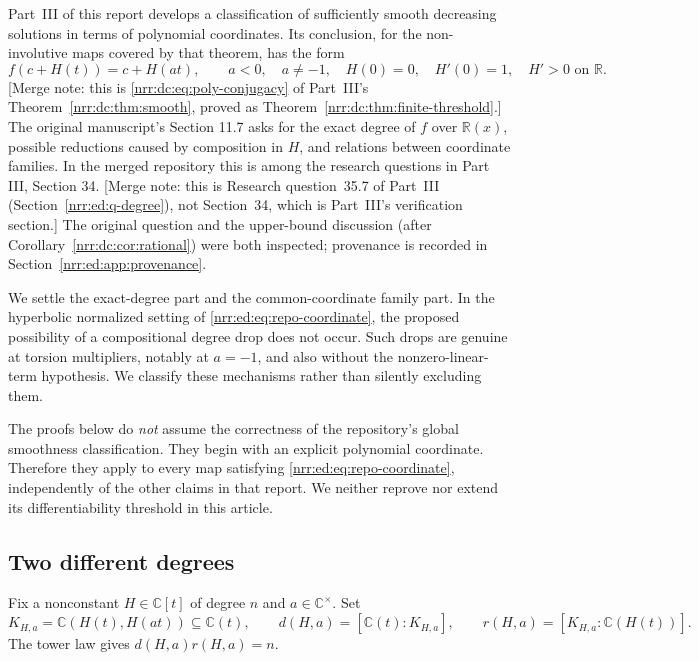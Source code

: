 \documentclass[11pt,letterpaper]{article}
\theoremstyle{definition}
\theoremstyle{remark}
\newcommand{\R}{\mathbb R}
\newcommand{\C}{\mathbb C}
\newcommand{\field}{K_{H,a}}
\begin{document}
Part~III of this report develops a classification of sufficiently smooth decreasing
solutions in terms of polynomial coordinates. Its conclusion, for the
non-involutive maps covered by that theorem, has the form
\begin{equation}
 f(c+H(t))=c+H(at),\qquad
 a<0,\quad a\ne-1,\quad H(0)=0,\quad H'(0)=1,\quad H'>0\text{ on }\R.
 \label{nrr:ed:eq:repo-coordinate}
\end{equation}
[Merge note: this is \eqref{nrr:dc:eq:poly-conjugacy} of Part~III's
Theorem~\ref{nrr:dc:thm:smooth}, proved as
Theorem~\ref{nrr:dc:thm:finite-threshold}.]
The original manuscript's Section 11.7 asks for the exact degree of $f$ over
$\R(x)$, possible reductions caused by composition in $H$, and relations between
coordinate families. In the merged repository this is among the research questions
in Part III, Section 34. [Merge note: this is Research question~35.7 of
Part~III (Section~\ref{nrr:ed:q-degree}), not Section~34, which is
Part~III's verification section.] The original question and the upper-bound
discussion (after Corollary~\ref{nrr:dc:cor:rational}) were both inspected;
provenance is recorded in Section~\ref{nrr:ed:app:provenance}.

We settle the exact-degree part and the common-coordinate family part. In the
hyperbolic normalized setting of \eqref{nrr:ed:eq:repo-coordinate}, the proposed possibility
of a compositional degree drop does not occur. Such drops are genuine at torsion
multipliers, notably at $a=-1$, and also without the nonzero-linear-term hypothesis.
We classify these mechanisms rather than silently excluding them.

The proofs below do \emph{not} assume the correctness of the repository's global
smoothness classification. They begin with an explicit polynomial coordinate.
Therefore they apply to every map satisfying \eqref{nrr:ed:eq:repo-coordinate}, independently
of the other claims in that report. We neither reprove nor extend its differentiability
threshold in this article.

\subsection{Two different degrees}

Fix a nonconstant $H\in\C[t]$ of degree $n$ and $a\in\C^\times$. Set
\begin{equation}
 \field=\C(H(t),H(at))\subseteq\C(t),\qquad
 d(H,a)=[\C(t):\field],\qquad
 r(H,a)=[\field:\C(H(t))].
 \label{nrr:ed:eq:fields}
\end{equation}
The tower law gives $d(H,a)r(H,a)=n$.
\end{document}
